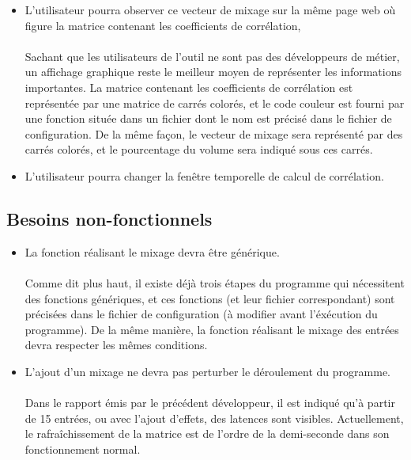 \documentclass{article}
\begin{document}
\begin{itemize}
	      \paragraph{}

	\item L'utilisateur pourra observer ce vecteur de mixage sur la même page
	      web où figure la matrice contenant les coefficients de corrélation,
	      \paragraph{}
	      Sachant que les utilisateurs de l'outil ne sont pas des développeurs de
	      métier, un affichage graphique reste le meilleur moyen de représenter les
	      informations importantes. La matrice contenant les coefficients de
	      corrélation est représentée par une matrice de carrés colorés, et le
	      code couleur est fourni par une fonction située dans un fichier dont le
	      nom est précisé dans le fichier de configuration. De la même façon, le
	      vecteur de mixage sera représenté par des carrés colorés, et le
	      pourcentage du volume sera indiqué sous ces carrés.\\

	\item L'utilisateur pourra changer la fenêtre temporelle de calcul de
	      corrélation.
\end{itemize}
\subsection{Besoins non-fonctionnels}
\begin{itemize}
	\item La fonction réalisant le mixage devra être générique.
	      \paragraph{}
	      Comme dit plus haut, il existe déjà trois étapes du programme qui
	      nécessitent des fonctions génériques, et ces fonctions (et leur fichier
	      correspondant) sont précisées dans le fichier de configuration (à
	      modifier avant l'éxécution du programme). De la même manière, la
	      fonction réalisant le mixage des entrées devra respecter les mêmes
	      conditions.
	\item L'ajout d'un mixage ne devra pas perturber le déroulement du programme.
	      \paragraph{}
	      Dans le rapport émis par le précédent développeur, il est indiqué qu'à
	      partir de 15 entrées, ou avec l'ajout d'effets, des latences sont
	      visibles. Actuellement, le rafraîchissement de la matrice est de l'ordre
	      de la demi-seconde dans son fonctionnement normal.
\end{itemize}
\end{document}
